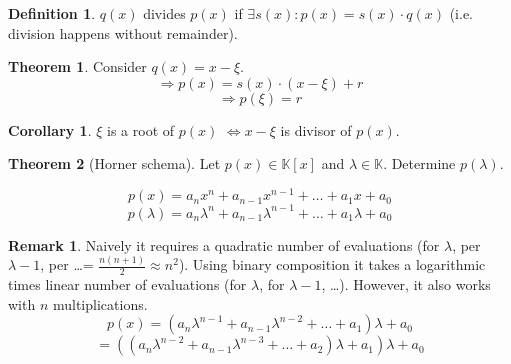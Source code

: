 \documentclass[a4paper,landscape,twocolumn]{article}
\theoremstyle{definition}
\newtheorem{theorem}{Theorem}
\newtheorem{defi}{Definition}
\newtheorem{rem}{Remark}
\newtheorem{cor}{Corollary}
\begin{document}
\begin{defi}
  \label{defi-9.19}
  $q(x)$ divides $p(x)$ if $\exists s(x): p(x) = s(x) \cdot q(x)$
  (i.e. division happens without remainder).
\end{defi}

\begin{theorem}
  \label{defi-9.20}
  Consider $q(x) = x - \xi$.
  \[ \Rightarrow p(x) = s(x) \cdot (x - \xi) + r \]
  \[ \Rightarrow p(\xi) = r \]
\end{theorem}

\begin{cor}
  $\xi$ is a root of $p(x)$ $\Leftrightarrow x - \xi$ is divisor of $p(x)$.
\end{cor}

\begin{theorem}[Horner schema]
  Let $p(x) \in \mathbb K[x]$ and $\lambda \in \mathbb K$.
  Determine $p(\lambda)$.

  \[ p(x) = a_n x^n + a_{n-1} x^{n-1} + \ldots + a_{1} x + a_0 \]
  \[ p(\lambda) = a_n \lambda^n + a_{n-1} \lambda^{n-1} + \ldots + a_{1} \lambda + a_0 \]
\end{theorem}

\begin{rem}
  Naively it requires a quadratic number of evaluations (for $\lambda$, per $\lambda-1$, per \dots = $\frac{n(n+1)}{2} \approx n^2$).
  Using binary composition it takes a logarithmic times linear number of evaluations (for $\lambda$, for $\lambda-1$, \dots).
  However, it also works with $n$ multiplications.
  \[ p(x) = (a_n \lambda^{n-1} + a_{n-1} \lambda^{n-2} + \ldots + a_1) \lambda + a_0 \]
  \[ = ((a_n \lambda^{n-2} + a_{n-1} \lambda^{n-3} + \ldots + a_2)\lambda + a_1) \lambda + a_0 \]
\end{rem}
\end{document}
